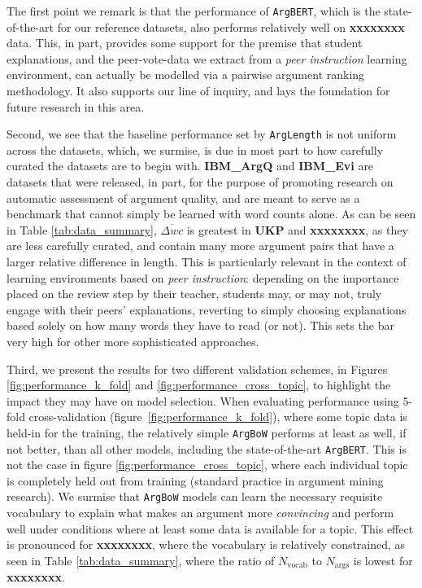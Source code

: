 \documentclass[runningheads]{llncs}
\begin{document}
The first point we remark is that the performance of \verb|ArgBERT|, which is 
the state-of-the-art for our reference datasets, also performs relatively well 
on \textbf{xxxxxxxx} data.
This, in part, provides some support for the premise that student explanations, 
and the peer-vote-data we extract from a \textit{peer instruction} learning 
environment, can actually be modelled via a pairwise argument ranking 
methodology.
It also supports our line of inquiry, and lays the foundation 
for future research in this area.

Second, we see that the baseline performance set by \verb|ArgLength| is 
not uniform across the datasets, which, we surmise, is due in most part to how 
carefully curated the datasets are to begin with.
\textbf{IBM\_ArgQ} and \textbf{IBM\_Evi} are datasets that were released, in 
part, for the purpose of promoting research on automatic assessment of argument 
quality, and are meant to serve as a benchmark that cannot simply be learned 
with word counts alone.   
As can be seen in Table \ref{tab:data_summary}, $\overline{\Delta wc}$ is 
greatest in \textbf{UKP} and \textbf{xxxxxxxx}, as they are less carefully 
curated, and contain many more argument pairs that have a larger relative 
difference in length. 
This is particularly relevant in the context of learning environments based 
on \textit{peer instruction}: depending on the importance placed on the 
review step by their teacher, students may, or may not, truly engage with their 
peers' explanations, reverting to simply choosing explanations based solely on 
how many words they have to read (or not). 
This sets the bar very high for other more sophisticated approaches.

Third, we present the results for two different validation schemes, in Figures 
\ref{fig:performance_k_fold} and \ref{fig:performance_cross_topic}, to 
highlight the impact they may have on model selection.
When evaluating performance using 5-fold cross-validation 
(figure~\ref{fig:performance_k_fold}), where some topic data is held-in for the 
training, the relatively simple \verb|ArgBoW| performs at least as well, if not 
better, than all other models, including the state-of-the-art \verb|ArgBERT|.
This is not the case in figure \ref{fig:performance_cross_topic}, where 
each individual topic is completely held out from training (standard practice 
in argument mining research).
We surmise that \verb|ArgBoW| models can learn the necessary requisite 
vocabulary to explain what makes an argument more \textit{convincing} and 
perform well under conditions where at least some data is available for a 
topic. 
This effect is pronounced for \textbf{xxxxxxxx}, where the vocabulary is 
relatively constrained, as seen in Table \ref{tab:data_summary}, where the 
ratio of $N_{\mathrm{vocab}}$ to $N_{\mathrm{args}}$ is lowest for 
\textbf{xxxxxxxx}. 
\end{document}
